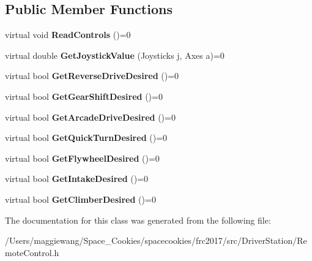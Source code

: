 \subsection*{Public Member Functions}
\begin{DoxyCompactItemize}
\item 
\mbox{\label{class_remote_control_a7dbf96cb324ba35eed5d321b20a684cc}} 
virtual void {\bfseries Read\+Controls} ()=0
\item 
\mbox{\label{class_remote_control_a8ab237f494be1e03acf73c7f1a074dc4}} 
virtual double {\bfseries Get\+Joystick\+Value} (Joysticks j, Axes a)=0
\item 
\mbox{\label{class_remote_control_ac4a415757aa25c0aaa51c079beb8b5ec}} 
virtual bool {\bfseries Get\+Reverse\+Drive\+Desired} ()=0
\item 
\mbox{\label{class_remote_control_a6bc6abea1db8060576faf0bfd764cd9c}} 
virtual bool {\bfseries Get\+Gear\+Shift\+Desired} ()=0
\item 
\mbox{\label{class_remote_control_a2899dfb8cf4f9530d11de7962293f2bf}} 
virtual bool {\bfseries Get\+Arcade\+Drive\+Desired} ()=0
\item 
\mbox{\label{class_remote_control_a20ad515a8b9c6f842844d3081ce29e1c}} 
virtual bool {\bfseries Get\+Quick\+Turn\+Desired} ()=0
\item 
\mbox{\label{class_remote_control_a14144e2e532e3468a72a2956d9ef5cc6}} 
virtual bool {\bfseries Get\+Flywheel\+Desired} ()=0
\item 
\mbox{\label{class_remote_control_aa241666a348854b42b230230bcf1f320}} 
virtual bool {\bfseries Get\+Intake\+Desired} ()=0
\item 
\mbox{\label{class_remote_control_a96e857bca429e1d09ad1db103666f66a}} 
virtual bool {\bfseries Get\+Climber\+Desired} ()=0
\end{DoxyCompactItemize}


The documentation for this class was generated from the following file\+:\begin{DoxyCompactItemize}
\item 
/\+Users/maggiewang/\+Space\+\_\+\+Cookies/spacecookies/frc2017/src/\+Driver\+Station/Remote\+Control.\+h\end{DoxyCompactItemize}
